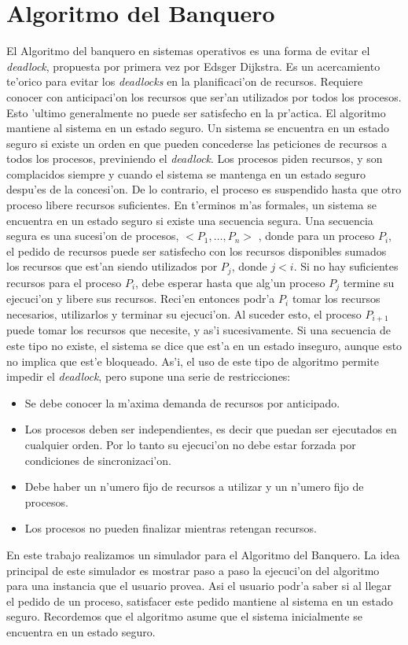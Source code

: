 \section{Algoritmo del Banquero}
El Algoritmo del banquero en sistemas operativos es una forma de evitar el
\emph{deadlock}, propuesta por primera vez por Edsger Dijkstra. Es un
acercamiento te'orico para evitar los \emph{deadlocks} en la planificaci'on de
recursos. Requiere conocer con anticipaci'on los recursos que ser'an utilizados
por todos los procesos. Esto 'ultimo generalmente no puede ser satisfecho en la
pr'actica.
El algoritmo mantiene al sistema en un estado seguro. Un sistema se encuentra
en un estado seguro si existe un orden en que pueden concederse las peticiones
de recursos a todos los procesos, previniendo el \emph{deadlock}.
Los procesos piden recursos, y son complacidos siempre y cuando el sistema se
mantenga en un estado seguro despu'es de la concesi'on. De lo contrario, el
proceso es suspendido hasta que otro proceso libere recursos suficientes.
En t'erminos m'as formales, un sistema se encuentra en un estado seguro si
existe una secuencia segura. Una secuencia segura es una sucesi'on de procesos,
$< P_1,\ldots, P_n >$ , donde para un proceso $P_i$, el pedido de recursos
puede ser satisfecho con los recursos disponibles sumados los recursos que
est'an siendo utilizados por $P_j$, donde $j < i$. Si no hay suficientes
recursos para el proceso $P_i$, debe esperar hasta que alg'un proceso $P_j$
termine su ejecuci'on y libere sus recursos. Reci'en entonces podr'a $P_i$
tomar los recursos necesarios, utilizarlos y terminar su ejecuci'on. Al suceder
esto, el proceso $P_{i+1}$ puede tomar los recursos que necesite, y as'i
sucesivamente. Si una secuencia de este tipo no existe, el sistema se dice que
est'a en un estado inseguro, aunque esto no implica que est'e bloqueado.
As'i, el uso de este tipo de algoritmo permite impedir el \emph{deadlock}, pero
supone una serie de restricciones:
\begin{itemize}
 \item Se debe conocer la m'axima demanda de recursos por anticipado.
 \item Los procesos deben ser independientes, es decir que puedan ser
ejecutados en cualquier orden. Por lo tanto su ejecuci'on no debe estar forzada
por condiciones de sincronizaci'on.
 \item Debe haber un n'umero fijo de recursos a utilizar y un n'umero fijo de
procesos.
 \item Los procesos no pueden finalizar mientras retengan recursos.
\end{itemize}
En este trabajo realizamos un simulador para el Algoritmo del Banquero. La idea
principal de este simulador es mostrar paso a paso la ejecuci'on del algoritmo
para una instancia que el usuario provea. Asi el usuario podr'a saber si al 
llegar el pedido de un proceso, satisfacer este pedido mantiene al sistema en
un estado seguro. Recordemos que el algoritmo asume que el sistema inicialmente
se encuentra en un estado seguro.

